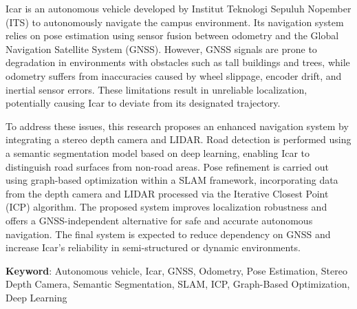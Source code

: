 \begin{spacing}{1}
	
Icar is an autonomous vehicle developed by Institut Teknologi Sepuluh Nopember (ITS) to autonomously navigate the campus environment. Its navigation system relies on pose estimation using sensor fusion between odometry and the Global Navigation Satellite System (GNSS). However, GNSS signals are prone to degradation in environments with obstacles such as tall buildings and trees, while odometry suffers from inaccuracies caused by wheel slippage, encoder drift, and inertial sensor errors. These limitations result in unreliable localization, potentially causing Icar to deviate from its designated trajectory.

To address these issues, this research proposes an enhanced navigation system by integrating a stereo depth camera and LIDAR. Road detection is performed using a semantic segmentation model based on deep learning, enabling Icar to distinguish road surfaces from non-road areas. Pose refinement is carried out using graph-based optimization within a SLAM framework, incorporating data from the depth camera and LIDAR processed via the Iterative Closest Point (ICP) algorithm. The proposed system improves localization robustness and offers a GNSS-independent alternative for safe and accurate autonomous navigation. The final system is expected to reduce dependency on GNSS and increase Icar's reliability in semi-structured or dynamic environments.

\vspace{2ex}
\textbf{Keyword}: Autonomous vehicle, Icar, GNSS, Odometry, Pose Estimation, Stereo Depth Camera, Semantic Segmentation, SLAM, ICP, Graph-Based Optimization, Deep Learning
\end{spacing}